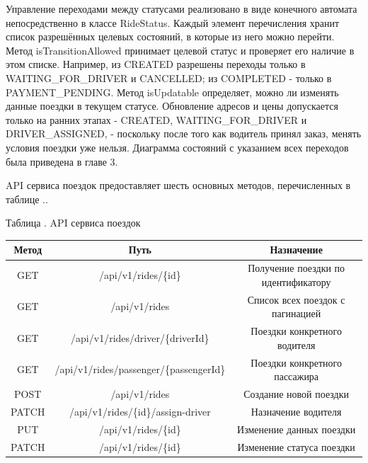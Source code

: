 {  \par \redline Управление переходами между статусами реализовано в виде конечного автомата непосредственно в классе RideStatus. Каждый элемент перечисления хранит список разрешённых целевых состояний, в которые из него можно перейти. Метод isTransitionAllowed принимает целевой статус и проверяет его наличие в этом списке. Например, из CREATED разрешены переходы только в WAITING\_FOR\_DRIVER и CANCELLED; из COMPLETED - только в PAYMENT\_PENDING. Метод isUpdatable определяет, можно ли изменять данные поездки в текущем статусе. Обновление адресов и цены допускается только на ранних этапах - CREATED, WAITING\_FOR\_DRIVER и DRIVER\_ASSIGNED, - поскольку после того как водитель принял заказ, менять условия поездки уже нельзя. Диаграмма состояний с указанием всех переходов была приведена в главе 3.

  \par \redline API сервиса поездок предоставляет шесть основных методов, перечисленных в таблице \thechaptercntr .\thetablecntr .

  \topTablespace
  {\begin{Center}
      \par Таблица \thechaptercntr .\thetablecntr \spc {--} API сервиса поездок

      \begin{tabular}{|c|c|c|}
        \hline
        Метод & Путь & Назначение \\ \hline
        GET & /api/v1/rides/\{id\} & Получение поездки по идентификатору \\ \hline
        GET & /api/v1/rides & Список всех поездок с пагинацией \\ \hline
        GET & /api/v1/rides/driver/\{driverId\} & Поездки конкретного водителя \\ \hline
        GET & /api/v1/rides/passenger/\{passengerId\} & Поездки конкретного пассажира \\ \hline
        POST & /api/v1/rides & Создание новой поездки \\ \hline
        PATCH & /api/v1/rides/\{id\}/assign-driver & Назначение водителя \\ \hline
        PUT & /api/v1/rides/\{id\} & Изменение данных поездки \\ \hline
        PATCH & /api/v1/rides/\{id\} & Изменение статуса поездки \\ \hline
    \end{tabular} \end{Center}}
  \botTablespace \addtocounter{tablecntr}{1}

}
